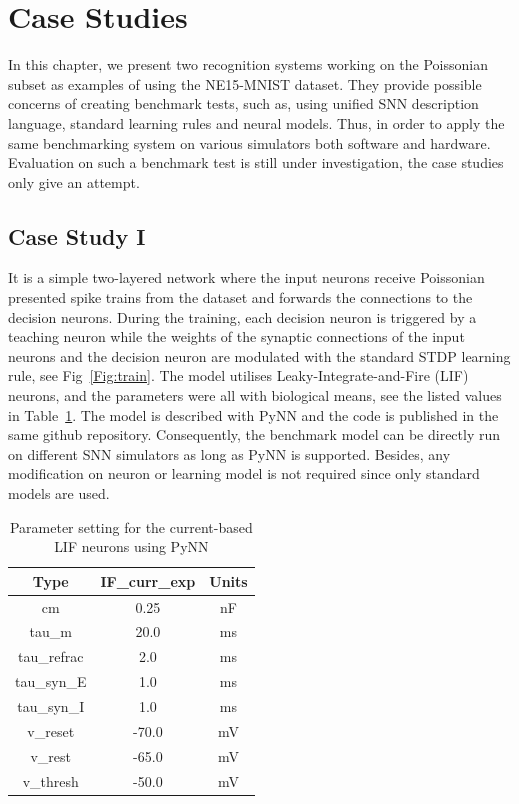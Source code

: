 \section{Case Studies}
\label{sec:test}
In this chapter, we present two recognition systems working on the Poissonian subset as examples of using the NE15-MNIST dataset.
They provide possible concerns of creating benchmark tests, such as, using unified SNN description language, standard learning rules and neural models.
Thus, in order to apply the same benchmarking system on various simulators both software and hardware.
Evaluation on such a benchmark test is still under investigation, the case studies only give an attempt.

\subsection{Case Study I}
It is a simple two-layered network where the input neurons receive Poissonian presented spike trains from the dataset and forwards the connections to the decision neurons.
During the training, each decision neuron is triggered by a teaching neuron while the weights of the synaptic connections of the input neurons and the decision neuron are modulated with the standard STDP learning rule, see Fig~\ref{Fig:train}.
The model utilises Leaky-Integrate-and-Fire (LIF) neurons, and the parameters were all with biological means, see the listed values in Table~\ref{tbl:pynnSetting}.
The model is described with PyNN and the code is published in the same github repository.
Consequently, the benchmark model can be directly run on different SNN simulators as long as PyNN is supported.
Besides, any modification on neuron or learning model is not required since only standard models are used.

\begin{table}[hbbp]
\centering
\caption{\label{tbl:pynnSetting}Parameter setting for the current-based LIF neurons using PyNN}
\bgroup
\def\arraystretch{1.1}
  \begin{tabular}{c|c|c}
  Type & IF\_curr\_exp & Units\\
  \hline
  cm & 0.25 & nF	\\
  tau\_m & 20.0 & ms\\
  tau\_refrac & 2.0 & ms\\
  tau\_syn\_E & 1.0 & ms\\
  tau\_syn\_I & 1.0 & ms\\
  v\_reset & -70.0 & mV\\
  v\_rest & -65.0 & mV\\
  v\_thresh & -50.0 & mV\\
  \end{tabular}
\egroup
\end{table}


